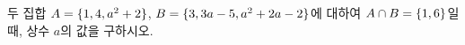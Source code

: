 두 집합 $A=\{1{,}\mkern3mu\mathopen{}4{,}\mkern3mu\mathopen{}a^2+2\}$, $B=\{3{,}\mkern3mu\mathopen{}3a-5{,}\mkern3mu\mathopen{}a^2+2a-2\}$에 대하여 $A\cap B=\{1{,}\mkern3mu\mathopen{}6\}$일 때, 상수 $a$의 값을 구하시오.
